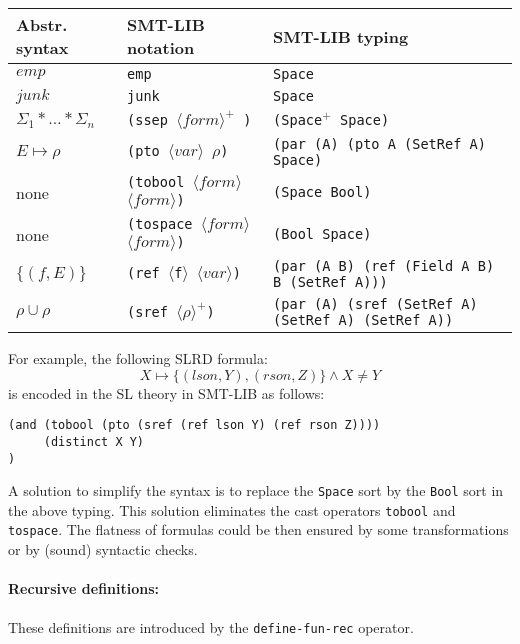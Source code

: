 \documentclass{llncs}
\newcommand{\posep}{*}
\newcommand{\points}{\mapsto}
\begin{document}
\medskip
\noindent
\begin{tabular}{l@{\hskip 4mm}l@{\hskip 4mm}p{5cm}}
Abstr. syntax & SMT-LIB notation & SMT-LIB typing
\\\hline
$\mathit{emp}$ & \texttt{emp} & \texttt{Space} 
\\
$\mathit{junk}$ & \texttt{junk} & \texttt{Space} 
\\
$\Sigma_1\posep\ldots\posep\Sigma_n$ & 
\texttt{(ssep $\langle\mathit{form}\rangle^+$ )} & 
\texttt{(Space$^+$ Space)} %
\\
$E \points \rho$ & 
\texttt{(pto $\langle\mathit{var}\rangle$ $\rho$)} &
\texttt{(par (A) (pto A (SetRef A) Space)} %
\\
none & 
\texttt{(tobool $\langle\mathit{form}\rangle$ $\langle\mathit{form}\rangle$)} &
\texttt{(Space Bool)}
\\
none & 
\texttt{(tospace $\langle\mathit{form}\rangle$ $\langle\mathit{form}\rangle$)} &
\texttt{(Bool Space)}
\\
$\{(f,E)\}$ & 
\texttt{(ref $\langle$f$\rangle$ $\langle\mathit{var}\rangle$)} &
\texttt{(par (A B) (ref (Field A B) B (SetRef A)))}
\\
$\rho\cup\rho$ &
\texttt{(sref $\langle\rho\rangle^+$)} &
\texttt{(par (A) (sref (SetRef A) (SetRef A) (SetRef A))} %
\end{tabular}

For example, the following SLRD formula: 
\begin{equation}\label{eq:ex1}
X\points\{(lson,Y),(rson,Z)\} \land X\neq Y
\end{equation}
is encoded in the SL theory in SMT-LIB as follows:
\begin{verbatim}
(and (tobool (pto (sref (ref lson Y) (ref rson Z))))
     (distinct X Y)
)
\end{verbatim}

\begin{remark}\label{rem:tobool}
A solution to simplify the syntax is to replace the \texttt{Space} sort by the \texttt{Bool} sort in the above typing.
This solution eliminates the cast operators \texttt{tobool} and \texttt{tospace}.
The flatness of formulas could be then ensured by some transformations or by (sound) syntactic checks.
\end{remark}


\paragraph{Recursive definitions:}
These definitions are introduced by the \texttt{define-fun-rec} operator.
\end{document}
